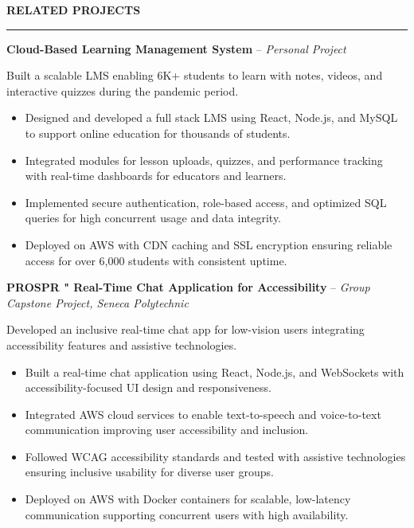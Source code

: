 \documentclass[10pt,letterpaper]{article}
\begin{document}
\vspace{6pt}

\textbf{RELATED PROJECTS}\\[-8pt]
\noindent\rule{\textwidth}{1pt}

\vspace{-2pt}

\textbf{Cloud-Based Learning Management System} -- \emph{Personal Project}

\vspace{-1pt}

Built a scalable LMS enabling 6K+ students to learn with notes, videos, and interactive quizzes during the pandemic period.
\vspace{-1pt}
\begin{itemize}
\item Designed and developed a full stack LMS using React, Node.js, and MySQL to support online education for thousands of students.
\item Integrated modules for lesson uploads, quizzes, and performance tracking with real-time dashboards for educators and learners.
\item Implemented secure authentication, role-based access, and optimized SQL queries for high concurrent usage and data integrity.
\item Deployed on AWS with CDN caching and SSL encryption ensuring reliable access for over 6,000 students with consistent uptime.
\end{itemize}

\textbf{PROSPR " Real-Time Chat Application for Accessibility} -- \emph{Group Capstone Project, Seneca Polytechnic}

\vspace{-1pt}

Developed an inclusive real-time chat app for low-vision users integrating accessibility features and assistive technologies.
\vspace{-1pt}
\begin{itemize}
\item Built a real-time chat application using React, Node.js, and WebSockets with accessibility-focused UI design and responsiveness.
\item Integrated AWS cloud services to enable text-to-speech and voice-to-text communication improving user accessibility and inclusion.
\item Followed WCAG accessibility standards and tested with assistive technologies ensuring inclusive usability for diverse user groups.
\item Deployed on AWS with Docker containers for scalable, low-latency communication supporting concurrent users with high availability.
\end{itemize}
\end{document}
